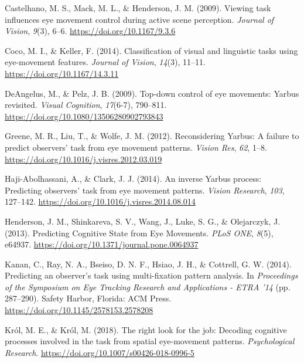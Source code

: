 \documentclass[
  english,
  man,floatsintext]{apa6}
\begin{document}
\leavevmode\hypertarget{ref-castelhanoViewingTaskInfluences2009}{}%
Castelhano, M. S., Mack, M. L., \& Henderson, J. M. (2009). Viewing task influences eye movement control during active scene perception. \emph{Journal of Vision}, \emph{9}(3), 6--6. \url{https://doi.org/10.1167/9.3.6}

\leavevmode\hypertarget{ref-cocoClassificationVisualLinguistic2014}{}%
Coco, M. I., \& Keller, F. (2014). Classification of visual and linguistic tasks using eye-movement features. \emph{Journal of Vision}, \emph{14}(3), 11--11. \url{https://doi.org/10.1167/14.3.11}

\leavevmode\hypertarget{ref-deangelusTopdownControlEye2009}{}%
DeAngelus, M., \& Pelz, J. B. (2009). Top-down control of eye movements: Yarbus revisited. \emph{Visual Cognition}, \emph{17}(6-7), 790--811. \url{https://doi.org/10.1080/13506280902793843}

\leavevmode\hypertarget{ref-greeneReconsideringYarbusFailure2012a}{}%
Greene, M. R., Liu, T., \& Wolfe, J. M. (2012). Reconsidering Yarbus: A failure to predict observers' task from eye movement patterns. \emph{Vision Res}, \emph{62}, 1--8. \url{https://doi.org/10.1016/j.visres.2012.03.019}

\leavevmode\hypertarget{ref-haji-abolhassaniInverseYarbusProcess2014}{}%
Haji-Abolhassani, A., \& Clark, J. J. (2014). An inverse Yarbus process: Predicting observers' task from eye movement patterns. \emph{Vision Research}, \emph{103}, 127--142. \url{https://doi.org/10.1016/j.visres.2014.08.014}

\leavevmode\hypertarget{ref-hendersonPredictingCognitiveState2013a}{}%
Henderson, J. M., Shinkareva, S. V., Wang, J., Luke, S. G., \& Olejarczyk, J. (2013). Predicting Cognitive State from Eye Movements. \emph{PLoS ONE}, \emph{8}(5), e64937. \url{https://doi.org/10.1371/journal.pone.0064937}

\leavevmode\hypertarget{ref-kananPredictingObserverTask2014}{}%
Kanan, C., Ray, N. A., Bseiso, D. N. F., Hsiao, J. H., \& Cottrell, G. W. (2014). Predicting an observer's task using multi-fixation pattern analysis. In \emph{Proceedings of the Symposium on Eye Tracking Research and Applications - ETRA '14} (pp. 287--290). Safety Harbor, Florida: ACM Press. \url{https://doi.org/10.1145/2578153.2578208}

\leavevmode\hypertarget{ref-krolRightLookJob2018}{}%
Król, M. E., \& Król, M. (2018). The right look for the job: Decoding cognitive processes involved in the task from spatial eye-movement patterns. \emph{Psychological Research}. \url{https://doi.org/10.1007/s00426-018-0996-5}
\end{document}
